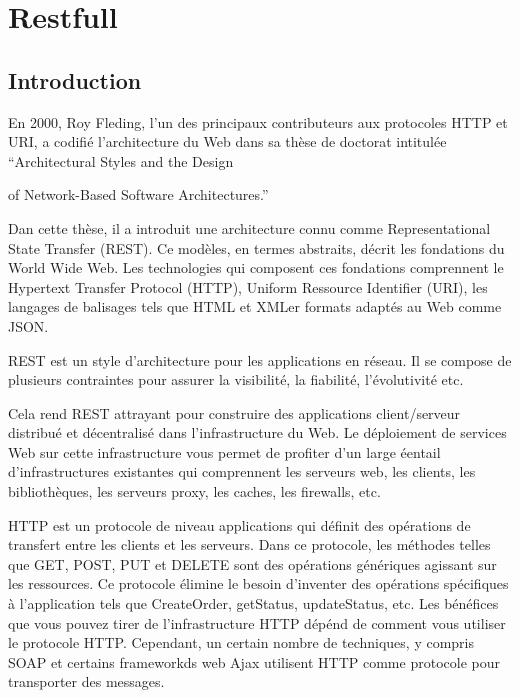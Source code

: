 \chapter{Restfull}
\label{ch:restfull}

\section*{Introduction}

En 2000, Roy Fleding, l’un des principaux contributeurs aux protocoles HTTP et URI, a codifié l’architecture du Web dans sa thèse de doctorat intitulée “Architectural Styles and the Design

of Network-Based Software Architectures.”

Dan cette thèse, il a introduit une architecture connu comme Representational State Transfer (REST). Ce modèles, en termes abstraits, décrit les fondations du World Wide Web. Les technologies qui composent ces fondations comprennent le Hypertext Transfer Protocol (HTTP), Uniform Ressource Identifier (URI), les langages de balisages tels que HTML et XMLer formats adaptés au Web comme JSON.

REST est un style d’architecture pour les applications en réseau. Il se compose de plusieurs contraintes pour assurer la visibilité, la fiabilité, l’évolutivité etc.

Cela rend REST attrayant pour construire des applications client/serveur distribué et décentralisé dans l’infrastructure du Web. Le déploiement de services Web sur cette infrastructure vous permet de profiter d’un large éentail d’infrastructures existantes qui comprennent les serveurs web, les clients, les bibliothèques, les serveurs proxy, les caches, les firewalls, etc.

HTTP est un protocole de niveau applications qui définit des opérations de transfert entre les clients et les serveurs. Dans ce protocole, les méthodes telles que GET, POST, PUT et DELETE sont des opérations génériques agissant sur les ressources. Ce protocole élimine le besoin d’inventer des opérations spécifiques à l’application tels que CreateOrder, getStatus, updateStatus, etc.  Les bénéfices que vous pouvez tirer de l'infrastructure HTTP dépénd de comment vous utiliser le protocole HTTP. Cependant, un certain nombre de techniques, y compris SOAP et certains frameworkds web Ajax utilisent HTTP comme protocole pour transporter des messages. 
